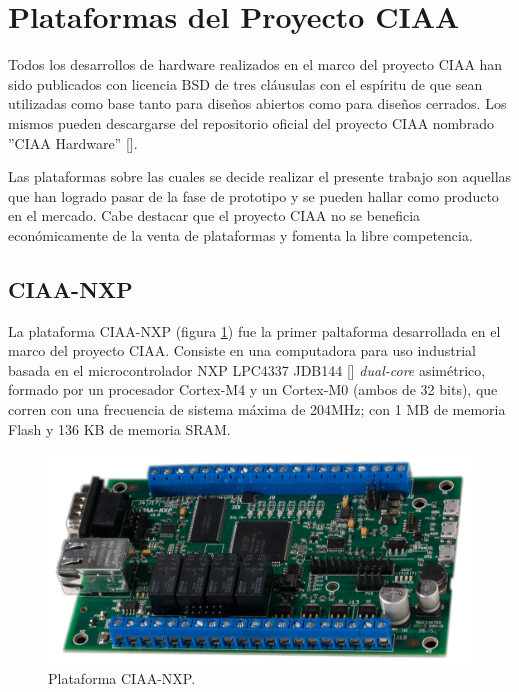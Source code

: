 \section{Plataformas del Proyecto CIAA}
\label{sec:ciaaBoards}

Todos los desarrollos de hardware realizados en el marco del proyecto CIAA han sido publicados con licencia BSD de tres cláusulas con el espíritu de que sean utilizadas como base tanto para diseños abiertos como para diseños cerrados. Los mismos pueden descargarse del repositorio oficial del proyecto CIAA nombrado ''CIAA Hardware'' [].

Las plataformas sobre las cuales se decide realizar el presente trabajo son aquellas que han logrado pasar de la fase de prototipo y se pueden hallar como producto en el mercado. Cabe destacar que el proyecto CIAA no se beneficia económicamente de la venta de plataformas y fomenta la libre competencia.

\subsection{CIAA-NXP}

La plataforma CIAA-NXP (figura \ref{fig:ciaaNxp}) fue la primer paltaforma desarrollada en el marco del proyecto CIAA. Consiste en una computadora para uso industrial basada en el microcontrolador NXP LPC4337 JDB144 [] \emph{dual-core} asimétrico, formado por un procesador Cortex-M4 y un Cortex-M0 (ambos de 32 bits), que corren con una frecuencia de sistema máxima de 204MHz; con 1 MB de memoria Flash y 136 KB de memoria SRAM.


\begin{figure}[!htbp]
\begin{center}  %
\includegraphics*[width=\textwidth]{Figures/CIAA-NXP_Foto.png}
\par\caption{Plataforma CIAA-NXP.}\label{fig:ciaaNxp}
\end{center}
\end{figure}

